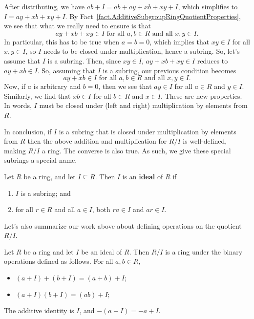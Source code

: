 After distributing, we have $ab + I = ab + ay + xb + xy +I$, which simplifies to $I = ay + xb + xy +I$. By Fact~\ref{fact.AdditiveSubgroupRingQuotientProperties}, we see that what we really need to ensure is that 
\[ay + xb + xy\in I \text{ for all $a,b\in R$ and all $x,y\in I$}.\] 
In particular, this has to be true when $a=b=0$, which implies that $xy\in I$ for all $x,y\in I$, so $I$ needs to be closed under multiplication, hence a subring. So, let's assume that $I$ is a subring. Then, since $xy \in I$,  $ay + xb + xy\in I$ reduces to $ay + xb\in I$. So, assuming that $I$ is a subring, our previous condition becomes
\[ay + xb\in I \text{ for all $a,b\in R$ and all $x,y\in I$}.\] 
Now, if $a$ is arbitrary and $b=0$, then we see that $ay \in I$ for all $a\in R$ and $y\in I$. Similarly, we find that $xb \in I$ for all $b\in R$ and $x\in I$. These are new properties. In words, $I$ must be closed under (left and right) multiplication by elements from $R$. 

In conclusion, if $I$ is a subring that is closed under multiplication by elements from $R$ then the above addition and multiplication for $R/I$ is well-defined, making $R/I$ a ring. The converse is also true. As such, we give these special subrings a special name.

\begin{definition}
Let $R$ be a ring, and let $I\subseteq R$. Then $I$ is an \textbf{ideal} of $R$ if  
\begin{enumerate}
\item $I$ is a subring; and 
\item for all $r\in R$ and all $a\in I$, both $ra\in I$ and $ar\in I$.
\end{enumerate}
\end{definition}

Let's also summarize our work above about defining operations on the quotient $R/I$.

\begin{fact}\label{fact.QuotientRing}
Let $R$ be a ring and let $I$ be an ideal of $R$.  Then $R/I$ is a ring under the binary operations defined as follows. For all $a,b\in R$, 
\begin{itemize}
\item $(a+I)+(b+I)  =  (a+b)+I$;
\item $(a+I)(b+I)  = (ab)+I;$
\end{itemize}
The additive identity is $I$, and $-(a+I)  =  -a + I$.

\end{fact}

